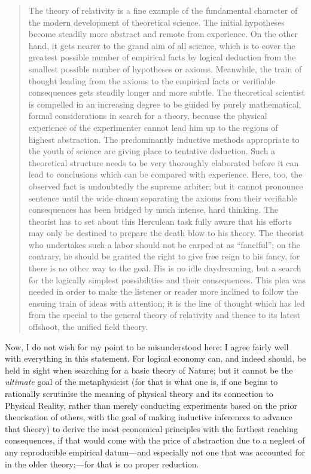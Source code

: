 \begin{quotation}
The theory of relativity is a fine example of the fundamental character of the modern development of theoretical science. The initial hypotheses become steadily more abstract and remote from experience. On the other hand, it gets nearer to the grand aim of all science, which is to cover the greatest possible number of empirical facts by logical deduction from the smallest possible number of hypotheses or axioms. Meanwhile, the train of thought leading from the axioms to the empirical facts or verifiable consequences gets steadily longer and more subtle. The theoretical scientist is compelled in an increasing degree to be guided by purely mathematical, formal considerations in search for a theory, because the physical experience of the experimenter cannot lead him up to the regions of highest abstraction. The predominantly inductive methods appropriate to the youth of science are giving place to tentative deduction. Such a theoretical structure needs to be very thoroughly elaborated before it can lead to conclusions which can be compared with experience. Here, too, the observed fact is undoubtedly the supreme arbiter; but it cannot pronounce sentence until the wide chasm separating the axioms from their verifiable consequences has been bridged by much intense, hard thinking. The theorist has to set about this Herculean task fully aware that his efforts may only be destined to prepare the death blow to his theory. The theorist who undertakes such a labor should not be carped at as ``fanciful''; on the contrary, he should be granted the right to give free reign to his fancy, for there is no other way to the goal. His is no idle daydreaming, but a search for the logically simplest possibilities and their consequences. This plea was needed in order to make the listener or reader more inclined to follow the ensuing train of ideas with attention; it is the line of thought which has led from the special to the general theory of relativity and thence to its latest offshoot, the unified field theory.
\end{quotation}

Now, I do not wish for my point to be misunderstood here: I agree fairly well with everything in this statement. For logical economy can, and indeed should, be held in sight when searching for a basic theory of Nature; but it cannot be the \textit{ultimate} goal of the metaphysicist (for that is what one is, if one begins to rationally scrutinise the meaning of physical theory and its connection to Physical Reality, rather than merely conducting experiments based on the prior theorisation of others, with the goal of making inductive inferences to advance that theory) to derive the most economical principles with the farthest reaching consequences, if that would come with the price of abstraction due to a neglect of any reproducible empirical datum---and especially not one that was accounted for in the older theory;---for that is no proper reduction. 

